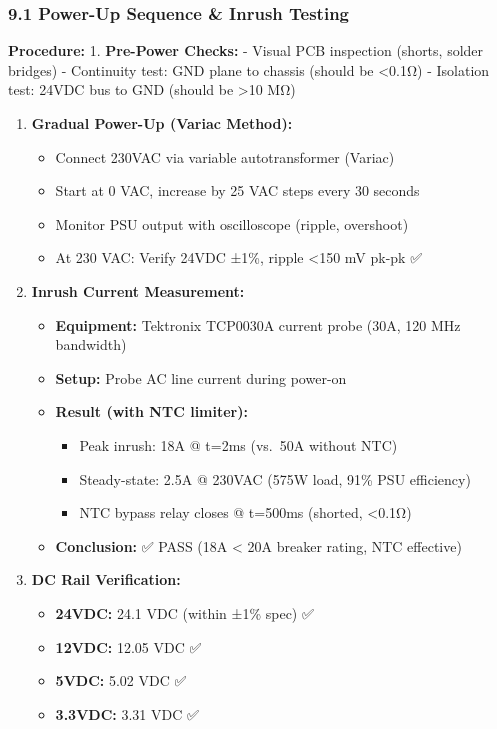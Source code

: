 \documentclass[
]{article}
\providecommand{\tightlist}{%
  \setlength{\itemsep}{0pt}\setlength{\parskip}{0pt}}
\begin{document}
\hypertarget{power-up-sequence-inrush-testing}{%
\subsubsection{9.1 Power-Up Sequence \& Inrush
Testing}\label{power-up-sequence-inrush-testing}}

\textbf{Procedure:} 1. \textbf{Pre-Power Checks:} - Visual PCB
inspection (shorts, solder bridges) - Continuity test: GND plane to
chassis (should be \textless0.1Ω) - Isolation test: 24VDC bus to GND
(should be \textgreater10 MΩ)

\begin{enumerate}
\def\labelenumi{\arabic{enumi}.}
\setcounter{enumi}{1}
\tightlist
\item
  \textbf{Gradual Power-Up (Variac Method):}

  \begin{itemize}
  \tightlist
  \item
    Connect 230VAC via variable autotransformer (Variac)
  \item
    Start at 0 VAC, increase by 25 VAC steps every 30 seconds
  \item
    Monitor PSU output with oscilloscope (ripple, overshoot)
  \item
    At 230 VAC: Verify 24VDC ±1\%, ripple \textless150 mV pk-pk ✅
  \end{itemize}
\item
  \textbf{Inrush Current Measurement:}

  \begin{itemize}
  \tightlist
  \item
    \textbf{Equipment:} Tektronix TCP0030A current probe (30A, 120 MHz
    bandwidth)
  \item
    \textbf{Setup:} Probe AC line current during power-on
  \item
    \textbf{Result (with NTC limiter):}

    \begin{itemize}
    \tightlist
    \item
      Peak inrush: 18A @ t=2ms (vs.~50A without NTC)
    \item
      Steady-state: 2.5A @ 230VAC (575W load, 91\% PSU efficiency)
    \item
      NTC bypass relay closes @ t=500ms (shorted, \textless0.1Ω)
    \end{itemize}
  \item
    \textbf{Conclusion:} ✅ PASS (18A \textless{} 20A breaker rating,
    NTC effective)
  \end{itemize}
\item
  \textbf{DC Rail Verification:}

  \begin{itemize}
  \tightlist
  \item
    \textbf{24VDC:} 24.1 VDC (within ±1\% spec) ✅
  \item
    \textbf{12VDC:} 12.05 VDC ✅
  \item
    \textbf{5VDC:} 5.02 VDC ✅
  \item
    \textbf{3.3VDC:} 3.31 VDC ✅
  \end{itemize}
\end{enumerate}
\end{document}
